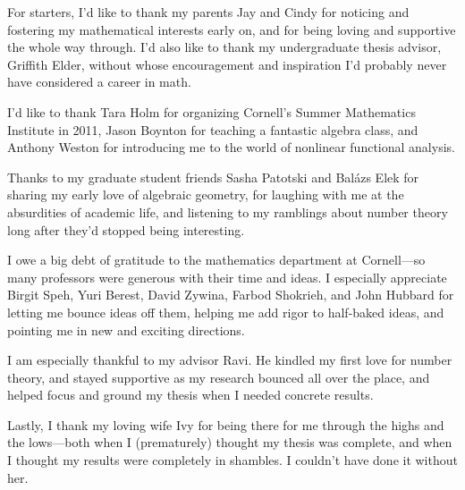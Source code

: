 \documentclass[phd,cornellheadings]{cornell}
\begin{document}
\begin{acknowledgements}
For starters, I'd like to thank my parents Jay and Cindy for noticing and 
fostering my mathematical interests early on, and for being loving and 
supportive the whole way through. I'd also like to thank my undergraduate 
thesis advisor, Griffith Elder, without whose encouragement and inspiration 
I'd probably never have considered a career in math. 

I'd like to thank Tara Holm for organizing Cornell's Summer Mathematics 
Institute in 2011, Jason Boynton for teaching a fantastic algebra class, and 
Anthony Weston for introducing me to the world of nonlinear functional 
analysis. 

Thanks to my graduate student friends Sasha Patotski and Bal\'azs Elek for 
sharing my early love of algebraic geometry, for laughing with me at the 
absurdities of academic life, and listening to my ramblings about number 
theory long after they'd stopped being interesting. 

I owe a big debt of gratitude to the mathematics department at Cornell---so 
many professors were generous with their time and ideas. I especially 
appreciate Birgit Speh, Yuri Berest, David Zywina, Farbod Shokrieh, and John 
Hubbard for letting me bounce ideas off them, helping me add rigor to 
half-baked ideas, and pointing me in new and exciting directions. 

I am especially thankful to my advisor Ravi. He kindled my first love for 
number theory, and stayed supportive as my research bounced all over the place, 
and helped focus and ground my thesis when I needed concrete results. 

Lastly, I thank my loving wife Ivy for being there for me through the highs and 
the lows---both when I (prematurely) thought my thesis was complete, and when I 
thought my results were completely in shambles. I couldn't have done it 
without her. 
\end{acknowledgements}

\contentspage

\normalspacing
\setcounter{page}{1}
\pagestyle{cornell}




















\printbibliography
\end{document}
